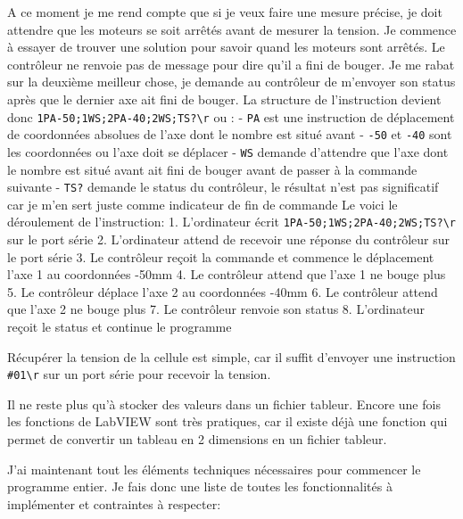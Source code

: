 \documentclass[a4paper, 12pt]{article}
\begin{document}
A ce moment je me rend compte que si je veux faire une mesure précise, je doit attendre que les moteurs se soit arrêtés avant de mesurer la tension.  
Je commence à essayer de trouver une solution pour savoir quand les moteurs sont arrêtés.  
Le contrôleur ne renvoie pas de message pour dire qu'il a fini de bouger.  
Je me rabat sur la deuxième meilleur chose, je demande au contrôleur de m'envoyer son status après que le dernier axe ait fini de bouger.  
La structure de l'instruction devient donc \verb|1PA-50;1WS;2PA-40;2WS;TS?\r| ou :  
- \verb|PA| est une instruction de déplacement de coordonnées absolues de l'axe dont le nombre est situé avant  
- \verb|-50| et \verb|-40| sont les coordonnées ou l'axe doit se déplacer  
- \verb|WS| demande d'attendre que l'axe dont le nombre est situé avant ait fini de bouger avant de passer à la commande suivante  
- \verb|TS?| demande le status du contrôleur, le résultat n'est pas significatif car je m'en sert juste comme indicateur de fin de commande  
Le voici le déroulement de l'instruction:  
1. L'ordinateur écrit \verb|1PA-50;1WS;2PA-40;2WS;TS?\r| sur le port série  
2. L'ordinateur attend de recevoir une réponse du contrôleur sur le port série  
3. Le contrôleur reçoit la commande et commence le déplacement l'axe 1 au coordonnées -50mm  
4. Le contrôleur attend que l'axe 1 ne bouge plus  
5. Le contrôleur déplace l'axe 2 au coordonnées -40mm  
6. Le contrôleur attend que l'axe 2 ne bouge plus  
7. Le contrôleur renvoie son status  
8. L'ordinateur reçoit le status et continue le programme  
  
Récupérer la tension de la cellule est simple, car il suffit d'envoyer une instruction \verb|#01\r| sur un port série pour recevoir la tension.  
  
Il ne reste plus qu'à stocker des valeurs dans un fichier tableur.  
Encore une fois les fonctions de LabVIEW sont très pratiques, car il existe déjà une fonction qui permet de convertir un tableau en 2 dimensions en un fichier tableur.  
  
J'ai maintenant tout les éléments techniques nécessaires pour commencer le programme entier.  
Je fais donc une liste de toutes les fonctionnalités à implémenter et contraintes à respecter:  
\end{document}
